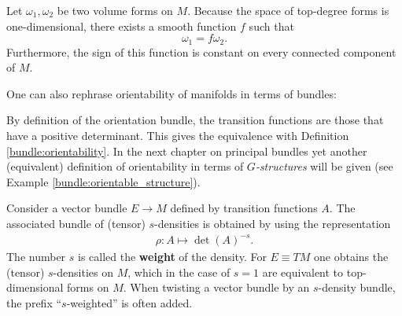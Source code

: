     \begin{property}
        Let $\omega_1,\omega_2$ be two volume forms on $M$. Because the space of top-degree forms is one-dimensional, there exists a smooth function $f$ such that \[\omega_1 = f\omega_2.\] Furthermore, the sign of this function is constant on every connected component of $M$.
    \end{property}

    One can also rephrase orientability of manifolds in terms of bundles:

    \begin{remark}
        By definition of the orientation bundle, the transition functions are those that have a positive determinant. This gives the equivalence with Definition \ref{bundle:orientability}. In the next chapter on principal bundles yet another (equivalent) definition of orientability in terms of \textit{$G$-structures} will be given (see Example \ref{bundle:orientable_structure}).
    \end{remark}

    \begin{definition}\label{bundle:density}
        Consider a vector bundle $E\rightarrow M$ defined by transition functions $A$. The associated bundle of (tensor) $s$-densities is obtained by using the representation
        \begin{gather}
            \rho:A\mapsto\det(A)^{-s}.
        \end{gather}
        The number $s$ is called the \textbf{weight} of the density. For $E\equiv TM$ one obtains the (tensor) $s$-densities on $M$, which in the case of $s=1$ are equivalent to top-dimensional forms on $M$. When twisting a vector bundle by an $s$-density bundle, the prefix ``$s$-weighted'' is often added.
    \end{definition}

